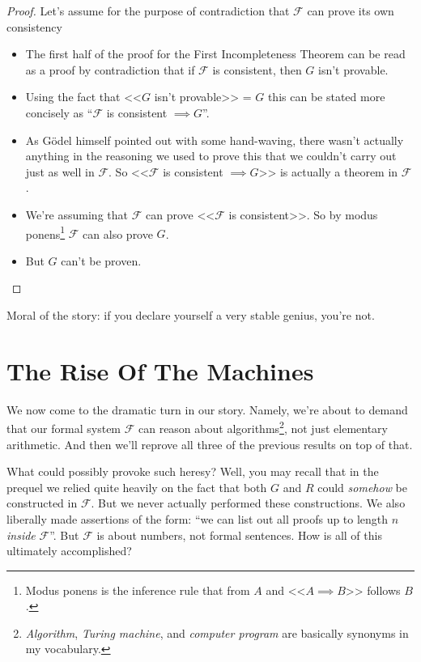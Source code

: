 \documentclass{article}
\theoremstyle{customstyle}
\newcommand{\F}{\ensuremath{\mathcal{F}}}
\begin{document}
\begin{proof}
Let's assume for the purpose of contradiction that $\F$ can prove its own consistency
\begin{itemize}[topsep=0.5em]
\item The first half of the proof for the First Incompleteness Theorem can be read as a proof by contradiction that if $\F$ is consistent, then $G$ isn't provable.
\item Using the fact that <<$G$ isn't provable>> = $G$ this can be stated more concisely as ``$\F$ is consistent $\implies G$''.
\item As Gödel himself pointed out with some hand-waving, there wasn't actually anything in the reasoning we used to prove this that we couldn't carry out just as well in $\F$. So <<$\F$ is consistent $\implies G$>> is actually a theorem in $\F$.
\item We're assuming that $\F$ can prove <<$\F$ is consistent>>. So by modus ponens\footnote{Modus ponens is the inference rule that from $A$ and <<$A \implies B$>> follows $B$.} $\F$ can also prove $G$.
\item But $G$ can't be proven. \lightning
\end{itemize}
\end{proof}

Moral of the story: if you declare yourself a very stable genius, you're not.\cite{trump}

\section{The Rise Of The Machines}

We now come to the dramatic turn in our story. Namely, we're about to demand that our formal system $\F$ can reason about algorithms\footnote{\textit{Algorithm}, \textit{Turing machine}, and \textit{computer program} are basically synonyms in my vocabulary.}, not just elementary arithmetic. And then we'll reprove all three of the previous results on top of that.

What could possibly provoke such heresy? Well, you may recall that in the prequel we relied quite heavily on the fact that both $G$ and $R$ could \textit{somehow} be constructed in $\F$. But we never actually performed these constructions. We also liberally made assertions of the form: ``we can list out all proofs up to length $n$ \textit{inside} $\F$''. But $\F$ is about numbers, not formal sentences. How is all of this ultimately accomplished?
\end{document}
